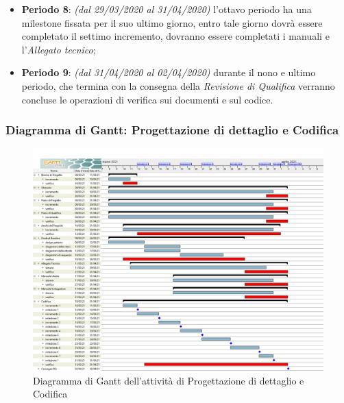 \begin{itemize}
\item \textbf{Periodo 8}: \textit{(dal 29/03/2020 al 31/04/2020)} l'ottavo periodo ha una milestone fissata per il suo ultimo giorno, entro tale giorno dovrà essere completato il settimo incremento, dovranno essere completati i manuali e l'\textit{Allegato tecnico};

\item \textbf{Periodo 9}: \textit{(dal 31/04/2020 al 02/04/2020)} durante il nono e ultimo periodo, che termina con la consegna della \textit{Revisione di Qualifica} verranno concluse le operazioni di verifica sui documenti e sul codice.

\end{itemize}

\subsubsection{Diagramma di Gantt: Progettazione di dettaglio e Codifica}
\begin{figure}[h]
 	\centering
	\includegraphics[scale=0.35]{Images/GanttPianificazioneProgettazioneDettaglioCodifica.png}
	\caption{Diagramma di Gantt dell'attività di Progettazione di dettaglio e Codifica}
\end{figure}
